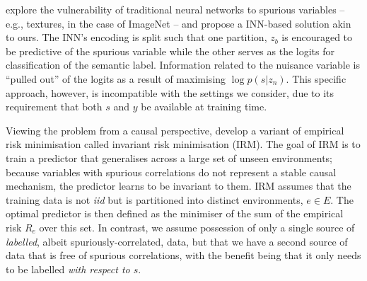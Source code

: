 \citet{JacBehZemBet19} explore the vulnerability of traditional neural networks to spurious variables -- e.g., textures, in the case of ImageNet \citep{Geir18} -- and propose a INN-based solution akin to ours.
The INN's encoding is split such that one partition, $z_b$ is encouraged to be predictive of the spurious variable while the other serves as the logits for classification of the semantic label. 
Information related to the nuisance variable is ``pulled out'' of the logits as a result of maximising $\log p(s|z_n)$.
This specific approach, however, is incompatible with the settings we consider, due to its requirement that both $s$ and $y$ be available at training time.

Viewing the problem from a causal perspective, \citet{arjovsky2019invariant} develop a variant of empirical risk minimisation called invariant risk minimisation (IRM).
The goal of IRM is to train a predictor that generalises across a large set of unseen environments; because variables with spurious correlations do not represent a stable causal mechanism, the predictor learns to be invariant to them. IRM assumes that the training data is not \emph{iid} but is partitioned into distinct environments, $e \in E$. The optimal predictor is then defined as the minimiser of the sum of the empirical risk $R_e$ over this set. In contrast, we assume possession of only a single source of \emph{labelled}, albeit spuriously-correlated, data, but that we have a second source of data that is free of spurious correlations, with the benefit being that it only needs to be labelled \emph{with respect to $s$}.


